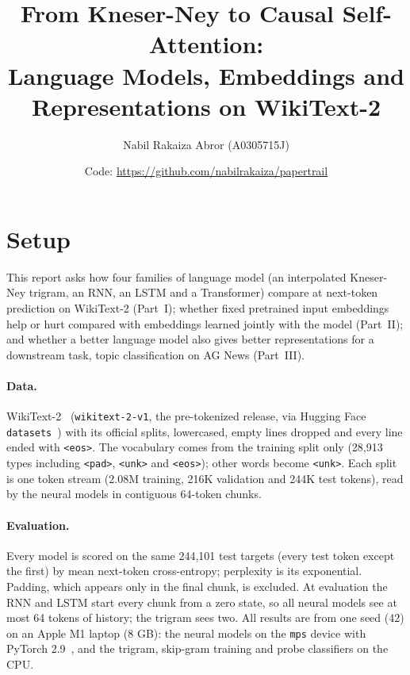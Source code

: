 \documentclass[10pt]{article}
\title{From Kneser-Ney to Causal Self-Attention:\\Language Models, Embeddings and Representations on WikiText-2}
\author{Nabil Rakaiza Abror (A0305715J)}
\date{Code: \url{https://github.com/nabilrakaiza/papertrail}}
\newcommand{\tok}[1]{\texttt{#1}}
\begin{document}
\maketitle

\section{Setup}

This report asks how four families of language model (an interpolated Kneser-Ney trigram, an RNN, an LSTM and a Transformer) compare at next-token prediction on WikiText-2 (Part~I); whether fixed pretrained input embeddings help or hurt compared with embeddings learned jointly with the model (Part~II); and whether a better language model also gives better representations for a downstream task, topic classification on AG News (Part~III).

\paragraph{Data.} WikiText-2~\cite{merity2016} (\tok{wikitext-2-v1}, the pre-tokenized release, via Hugging Face \tok{datasets}~\cite{lhoest2021}) with its official splits, lowercased, empty lines dropped and every line ended with \tok{<eos>}. The vocabulary comes from the training split only (28,913 types including \tok{<pad>}, \tok{<unk>} and \tok{<eos>}); other words become \tok{<unk>}. Each split is one token stream (2.08M training, 216K validation and 244K test tokens), read by the neural models in contiguous 64-token chunks.

\paragraph{Evaluation.} Every model is scored on the same 244,101 test targets (every test token except the first) by mean next-token cross-entropy; perplexity is its exponential. Padding, which appears only in the final chunk, is excluded. At evaluation the RNN and LSTM start every chunk from a zero state, so all neural models see at most 64 tokens of history; the trigram sees two. All results are from one seed (42) on an Apple M1 laptop (8 GB): the neural models on the \tok{mps} device with PyTorch 2.9~\cite{paszke2019}, and the trigram, skip-gram training and probe classifiers on the CPU.
\end{document}
